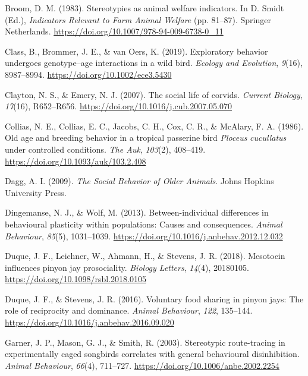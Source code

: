 \documentclass[
  pub]{apa6}
\newlength{\cslhangindent}
\newenvironment{CSLReferences}[2] %
 {\begin{list}{}{%
  \setlength{\itemindent}{0pt}
  \setlength{\leftmargin}{0pt}
  \setlength{\parsep}{0pt}
  \ifodd #1
   \setlength{\leftmargin}{\cslhangindent}
   \setlength{\itemindent}{-1\cslhangindent}
  \fi
  \setlength{\itemsep}{#2\baselineskip}}}
 {\end{list}}
\begin{document}
\begin{CSLReferences}{1}{0}
Broom, D. M. (1983). Stereotypies as animal welfare indicators. In D. Smidt (Ed.), \emph{Indicators {Relevant} to {Farm Animal Welfare}} (pp. 81--87). Springer Netherlands. \url{https://doi.org/10.1007/978-94-009-6738-0_11}

Class, B., Brommer, J. E., \& van Oers, K. (2019). Exploratory behavior undergoes genotype--age interactions in a wild bird. \emph{Ecology and Evolution}, \emph{9}(16), 8987--8994. \url{https://doi.org/10.1002/ece3.5430}

Clayton, N. S., \& Emery, N. J. (2007). The social life of corvids. \emph{Current Biology}, \emph{17}(16), R652--R656. \url{https://doi.org/10.1016/j.cub.2007.05.070}

Collias, N. E., Collias, E. C., Jacobs, C. H., Cox, C. R., \& McAlary, F. A. (1986). Old age and breeding behavior in a tropical passerine bird {\emph{Ploceus}}{ \emph{cucullatus}} under controlled conditions. \emph{The Auk}, \emph{103}(2), 408--419. \url{https://doi.org/10.1093/auk/103.2.408}

Dagg, A. I. (2009). \emph{The {Social Behavior} of {Older Animals}}. Johns Hopkins University Press.

Dingemanse, N. J., \& Wolf, M. (2013). Between-individual differences in behavioural plasticity within populations: Causes and consequences. \emph{Animal Behaviour}, \emph{85}(5), 1031--1039. \url{https://doi.org/10.1016/j.anbehav.2012.12.032}

Duque, J. F., Leichner, W., Ahmann, H., \& Stevens, J. R. (2018). Mesotocin influences pinyon jay prosociality. \emph{Biology Letters}, \emph{14}(4), 20180105. \url{https://doi.org/10.1098/rsbl.2018.0105}

Duque, J. F., \& Stevens, J. R. (2016). Voluntary food sharing in pinyon jays: The role of reciprocity and dominance. \emph{Animal Behaviour}, \emph{122}, 135--144. \url{https://doi.org/10.1016/j.anbehav.2016.09.020}

Garner, J. P., Mason, G. J., \& Smith, R. (2003). Stereotypic route-tracing in experimentally caged songbirds correlates with general behavioural disinhibition. \emph{Animal Behaviour}, \emph{66}(4), 711--727. \url{https://doi.org/10.1006/anbe.2002.2254}


\end{CSLReferences}
\end{document}
